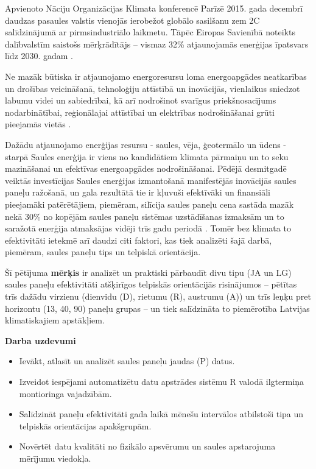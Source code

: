 Apvienoto Nāciju Organizācijas Klimata konferencē Parīzē 2015. gada decembrī daudzas pasaules valstis vienojās ierobežot globālo sasilšanu zem 2\textdegree C salīdzinājumā ar pirmsindustriālo laikmetu.
Tāpēc Eiropas Savienībā noteikts dalībvalstīm saistošs mērķrādītājs  –  vismaz 32\%  atjaunojamās enerģijas īpatsvars līdz 2030. gadam \cite{ES}.

Ne mazāk būtiska ir atjaunojamo energoresursu loma energoapgādes neatkarības un drošības veicināšanā, tehnoloģiju attīstībā un inovācijās, vienlaikus sniedzot labumu videi un sabiedrībai, kā arī nodrošinot svarīgus priekšnosacījums nodarbinātībai, reģionālajai attīstībai un elektrības nodrošināšanai grūti pieejamās vietās \cite{ES}.

Dažādu atjaunojamo enerģijas resursu - saules, vēja, ģeotermālo un ūdens - starpā Saules enerģija ir viens no kandidātiem klimata pārmaiņu un to seku mazināšanai un efektīvas energoapgādes nodrošināšanai. Pēdējā desmitgadē veiktās investīcijas Saules enerģijas izmantošanā manifestējās inovācijās saules paneļu ražošanā, un gala rezultātā tie ir kļuvuši efektīvāki un finansiāli pieejamāki patērētājiem, piemēram, silīcija saules paneļu cena sastāda mazāk nekā 30\% no kopējām saules paneļu sistēmas uzstādīšanas izmaksām un to saražotā enerģija atmaksājas vidēji trīs gadu periodā \cite{researchOpp}. Tomēr bez klimata to efektivitāti ietekmē arī daudzi citi faktori, kas tiek analizēti šajā darbā, piemēram, saules paneļu tips un telpiskā orientācija.

Šī pētījuma \textbf{mērķis} ir analizēt un praktiski pārbaudīt divu tipu (JA un LG) saules paneļu efektivitāti atšķirīgos telpiskās orientācijās risinājumos -- pētītas trīs dažādu virzienu (dienvidu (D), rietumu (R), austrumu (A)) un trīs leņķu pret horizontu (13\textdegree, 40\textdegree, 90\textdegree) paneļu grupas -- un tiek salīdzināta to piemērotība Latvijas klimatiskajiem apstākļiem.

\textbf{Darba uzdevumi}
\begin{itemize}
\item Ievākt, atlasīt un analizēt saules paneļu jaudas (P) datus.
\item Izveidot iespējami automatizētu datu apstrādes sistēmu R valodā ilgtermiņa montioringa vajadzībām.
\item Salīdzināt paneļu efektivitāti gada laikā mēnešu intervālos atbilstoši tipa un telpiskās orientācijas apakšgrupām.
\item Novērtēt datu kvalitāti no fizikālo apsvērumu un saules apstarojuma mērījumu viedokļa.
\end{itemize}


